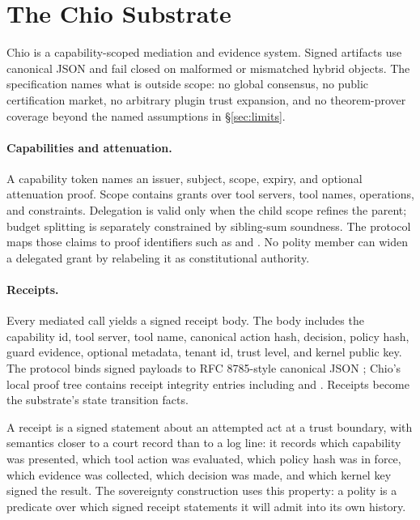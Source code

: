 \section{The Chio Substrate}

Chio is a capability-scoped mediation and evidence system. Signed artifacts use canonical JSON and fail closed on malformed or mismatched hybrid objects. The specification names what is outside scope: no global consensus, no public certification market, no arbitrary plugin trust expansion, and no theorem-prover coverage beyond the named assumptions in §\ref{sec:limits}.

\paragraph{Capabilities and attenuation.}
A capability token names an issuer, subject, scope, expiry, and optional attenuation proof. Scope contains grants over tool servers, tool names, operations, and constraints. Delegation is valid only when the child scope refines the parent; budget splitting is separately constrained by sibling-sum soundness. The protocol maps those claims to proof identifiers such as  and . No polity member can widen a delegated grant by relabeling it as constitutional authority.

\paragraph{Receipts.}
Every mediated call yields a signed receipt body. The body includes the capability id, tool server, tool name, canonical action hash, decision, policy hash, guard evidence, optional metadata, tenant id, trust level, and kernel public key. The protocol binds signed payloads to RFC 8785-style canonical JSON \cite{rfc8785}; Chio's local proof tree contains receipt integrity entries including  and . Receipts become the substrate's state transition facts.

A receipt is a signed statement about an attempted act at a trust boundary, with semantics closer to a court record than to a log line: it records which capability was presented, which tool action was evaluated, which policy hash was in force, which evidence was collected, which decision was made, and which kernel key signed the result. The sovereignty construction uses this property: a polity is a predicate over which signed receipt statements it will admit into its own history.


